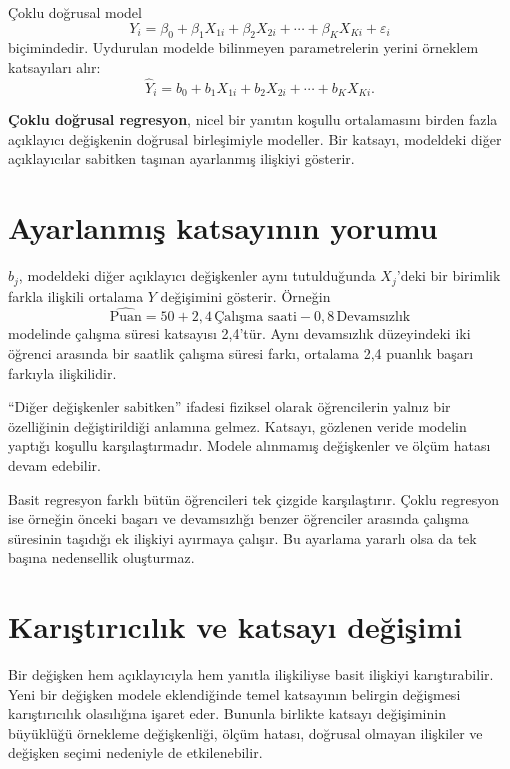 Çoklu doğrusal model
\[
Y_i=\beta_0+\beta_1X_{1i}+\beta_2X_{2i}+\cdots+
\beta_KX_{Ki}+\varepsilon_i
\]
biçimindedir. Uydurulan modelde bilinmeyen parametrelerin yerini örneklem
katsayıları alır:
\[
\hat Y_i=b_0+b_1X_{1i}+b_2X_{2i}+\cdots+b_KX_{Ki}.
\]

\begin{definitionbox}
\textbf{Çoklu doğrusal regresyon}, nicel bir yanıtın koşullu ortalamasını
birden fazla açıklayıcı değişkenin doğrusal birleşimiyle modeller. Bir katsayı,
modeldeki diğer açıklayıcılar sabitken taşınan ayarlanmış ilişkiyi gösterir.
\end{definitionbox}

\section{Ayarlanmış katsayının yorumu}
\label{sec:adjusted-coefficient}

$b_j$, modeldeki diğer açıklayıcı değişkenler aynı tutulduğunda $X_j$'deki
bir birimlik farkla ilişkili ortalama $Y$ değişimini gösterir. Örneğin
\[
\widehat{\text{Puan}}
=50+2{,}4\,\text{Çalışma saati}-0{,}8\,\text{Devamsızlık}
\]
modelinde çalışma süresi katsayısı 2,4'tür. Aynı devamsızlık düzeyindeki iki
öğrenci arasında bir saatlik çalışma süresi farkı, ortalama 2,4 puanlık başarı
farkıyla ilişkilidir.

``Diğer değişkenler sabitken'' ifadesi fiziksel olarak öğrencilerin yalnız
bir özelliğinin değiştirildiği anlamına gelmez. Katsayı, gözlenen veride
modelin yaptığı koşullu karşılaştırmadır. Modele alınmamış değişkenler ve
ölçüm hatası devam edebilir.

\begin{sezgibox}
Basit regresyon farklı bütün öğrencileri tek çizgide karşılaştırır. Çoklu
regresyon ise örneğin önceki başarı ve devamsızlığı benzer öğrenciler arasında
çalışma süresinin taşıdığı ek ilişkiyi ayırmaya çalışır. Bu ayarlama yararlı
olsa da tek başına nedensellik oluşturmaz.
\end{sezgibox}

\section{Karıştırıcılık ve katsayı değişimi}
\label{sec:confounding}

Bir değişken hem açıklayıcıyla hem yanıtla ilişkiliyse basit ilişkiyi
karıştırabilir. Yeni bir değişken modele eklendiğinde temel katsayının belirgin
değişmesi karıştırıcılık olasılığına işaret eder. Bununla birlikte katsayı
değişiminin büyüklüğü örnekleme değişkenliği, ölçüm hatası, doğrusal olmayan
ilişkiler ve değişken seçimi nedeniyle de etkilenebilir.

